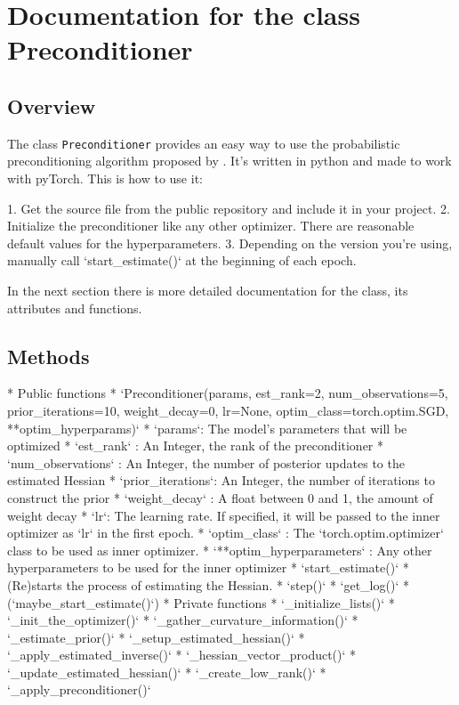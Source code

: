 \documentclass[twoside,12pt,a4paper]{report}
\begin{document}
\section{Documentation for the class Preconditioner}
\subsection{Overview}
The class \verb|Preconditioner| provides an easy way to use the probabilistic preconditioning algorithm proposed by \cite{roos2019active}. It's written in python and made to work with pyTorch.
This is how to use it:

\begin{markdown}
1. Get the source file from the public repository and include it in your project.
2. Initialize the preconditioner like any other optimizer. There are reasonable default values for the hyperparameters.
3. Depending on the version you're using, manually call `start_estimate()` at the beginning of each epoch.

In the next section there is more detailed documentation for the class, its attributes and functions.
\end{markdown}

\subsection{Methods}
\begin{markdown}
* Public functions
	* `Preconditioner(params, est_rank=2, num_observations=5, prior_iterations=10, weight_decay=0, lr=None,
	optim_class=torch.optim.SGD, **optim_hyperparams)`
		* `params`: The model's parameters that will be optimized
		* `est_rank` : An Integer, the rank of the preconditioner
		* `num_observations` : An Integer, the number of posterior updates to the estimated Hessian
		* `prior_iterations`: An Integer, the number of iterations to construct the prior
		* `weight_decay` : A float between 0 and 1, the amount of weight decay
		* `lr`: The learning rate. If specified, it will be passed to the inner optimizer as `lr` in the first epoch.
		* `optim_class` : The `torch.optim.optimizer` class to be used as inner optimizer.
		* `**optim_hyperparameters` : Any other hyperparameters to be used for the inner optimizer
	* `start_estimate()`
		* (Re)starts the process of estimating the Hessian.
	* `step()`
	* `get_log()`
	* (`maybe_start_estimate()`)
* Private functions
	* `_initialize_lists()`
	* `_init_the_optimizer()`
	* `_gather_curvature_information()`
	* `_estimate_prior()`
	* `_setup_estimated_hessian()`
	* `_apply_estimated_inverse()`
	* `_hessian_vector_product()`
	* `_update_estimated_hessian()`
	* `_create_low_rank()`
	* `_apply_preconditioner()`
	
\end{markdown}
\end{document}
